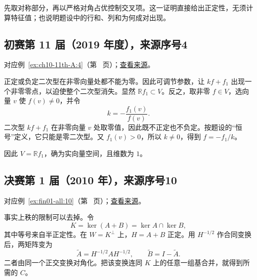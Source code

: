 \documentclass[12pt,fontset=fandol]{ctexart}
\begin{document}
\begin{remark}[方法与条件]

先取对称部分，再以严格对角占优控制交叉项。这一证明直接给出正定性，无须计算特征值；也说明题设中的行和、列和为何成对出现。

\end{remark}

\subsection{初赛第 11 届（2019 年度），来源序号4}\label{ans:ch10-11th-A:4}\label{pr:ch10-11th-A:4}

对应例~\ref{ex:ch10-11th-A:4}（第~\pageref{ex:ch10-11th-A:4} 页）；\href{https://github.com/lzxcr/cmc-mathematics/blob/64916fa1fdbc3e444a652eca204d5669058ee321/src/problems/preliminary/11/04.md}{查看来源}。

\begin{solve}

正定或负定二次型在非零向量处都不能为零。因此可调节参数，让 $kf+f_1$ 出现一个非零零点，以迫使整个二次型消失。显然 $\mathbb R f_1\subset V$。反之，取非零 $f\in V$，选向量 $v$ 使 $f(v)\neq0$，并令
\[
k=-\frac{f_1(v)}{f(v)}.
\]
二次型 $kf+f_1$ 在非零向量 $v$ 处取零值，因此既不正定也不负定。按题设的“恒号”定义，它只能是零二次型。又 $f_1(v)>0$，所以 $k\neq0$，得到 $f=-f_1/k$。

因此 $V=\mathbb R f_1$，确为实向量空间，且维数为 $1$。

\end{solve}

\subsection{决赛第 1 届（2010 年），来源序号10}\label{ans:fin01-all:10}\label{pr:fin01-all:10}

对应例~\ref{ex:fin01-all:10}（第~\pageref{ex:fin01-all:10} 页）；\href{https://github.com/lzxcr/cmc-mathematics/blob/64916fa1fdbc3e444a652eca204d5669058ee321/src/problems/finals/01/10.md}{查看来源}。

\begin{solve}

事实上秩的限制可以去掉。令
\[
K=\ker(A+B)=\ker A\cap\ker B,
\]
其中等号来自半正定性。在 $W=K^\perp$ 上，$H=A+B$ 正定。用 $H^{-1/2}$ 作合同变换后，两矩阵变为
\[
\widetilde A=H^{-1/2}AH^{-1/2},\qquad
\widetilde B=I-\widetilde A.
\]
二者由同一个正交变换对角化。把该变换连同 $K$ 上的任意一组基合并，就得到所需的 $C$。

\end{solve}
\end{document}
